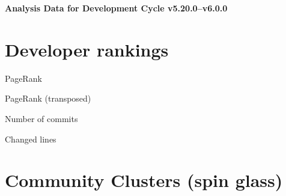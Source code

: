 \documentclass{article}
\begin{document}
\setlength{\parindent}{0pt}
\begin{center}
\begin{Large}
\textbf{Analysis Data for Development Cycle v5.20.0--v6.0.0}
\end{Large}
\end{center}
\section{Developer rankings}
\begin{small}\renewcommand{\tabcolsep}{1pt}
\begin{minipage}{0.5\linewidth}
PageRank\\

\end{minipage}%
\begin{minipage}{0.5\linewidth}
PageRank (transposed)\\

\end{minipage}

\renewcommand{\tabcolsep}{5pt}
\begin{minipage}{0.5\linewidth}
Number of commits\\

\end{minipage}%
\begin{minipage}{0.5\linewidth}
Changed lines\\

\end{minipage}
\end{small}
\newpage\section{Community Clusters (spin glass)}
\end{document}
